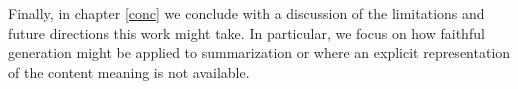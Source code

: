   
  Finally, in chapter \autoref{conc} we conclude with a discussion of the 
  limitations and future 
  directions this work might take. In particular, we focus on how 
  faithful generation might be applied to summarization or \machinetranslation
  where an explicit representation of the content meaning is not available. 
  






